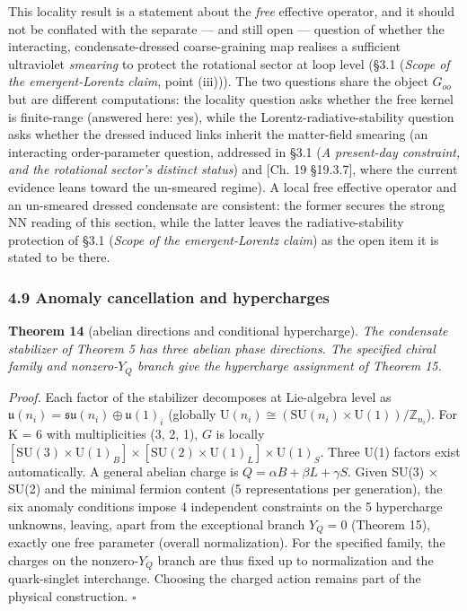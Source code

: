 \documentclass[
]{article}
\begin{document}
This locality result is a statement about the \emph{free} effective
operator, and it should not be conflated with the separate --- and still
open --- question of whether the interacting, condensate-dressed
coarse-graining map realises a sufficient ultraviolet \emph{smearing} to
protect the rotational sector at loop level (§3.1 (\emph{Scope of the
emergent-Lorentz claim}, point (iii))). The two questions share the
object \(G_{oo}\) but are different computations: the locality question
asks whether the free kernel is finite-range (answered here: yes), while
the Lorentz-radiative-stability question asks whether the dressed
induced links inherit the matter-field smearing (an interacting
order-parameter question, addressed in §3.1 (\emph{A present-day
constraint, and the rotational sector's distinct status}) and {[}Ch. 19
§19.3.7{]}, where the current evidence leans toward the un-smeared
regime). A local free effective operator and an un-smeared dressed
condensate are consistent: the former secures the strong NN reading of
this section, while the latter leaves the radiative-stability protection
of §3.1 (\emph{Scope of the emergent-Lorentz claim}) as the open item it
is stated to be there.

\hypertarget{anomaly-cancellation-and-hypercharges}{%
\subsubsection{4.9 Anomaly cancellation and
hypercharges}\label{anomaly-cancellation-and-hypercharges}}

\textbf{Theorem 14} (abelian directions and conditional hypercharge).
\emph{The condensate stabilizer of Theorem 5 has three abelian phase
directions. The specified chiral family and nonzero-\(Y_Q\) branch give
the hypercharge assignment of Theorem 15.}

\emph{Proof.} Each factor of the stabilizer decomposes at Lie-algebra
level as
\(\mathfrak{u}(n_i) = \mathfrak{su}(n_i) \oplus \mathfrak{u}(1)_i\)
(globally
\(\mathrm{U}(n_i) \cong (\mathrm{SU}(n_i) \times \mathrm{U}(1))/\mathbb{Z}_{n_i}\)).
For K = 6 with multiplicities (3, 2, 1), \(G\) is locally
\([\mathrm{SU}(3) \times \mathrm{U}(1)_B] \times [\mathrm{SU}(2) \times \mathrm{U}(1)_L] \times \mathrm{U}(1)_S\).
Three U(1) factors exist automatically. A general abelian charge is
\(Q = \alpha B + \beta L + \gamma S\). Given SU(3) × SU(2) and the
minimal fermion content (5 representations per generation), the six
anomaly conditions impose 4 independent constraints on the 5 hypercharge
unknowns, leaving, apart from the exceptional branch \(Y_Q=0\) (Theorem
15), exactly one free parameter (overall normalization). For the
specified family, the charges on the nonzero-\(Y_Q\) branch are thus
fixed up to normalization and the quark-singlet interchange. Choosing
the charged action remains part of the physical construction.
\(\square\)
\end{document}
